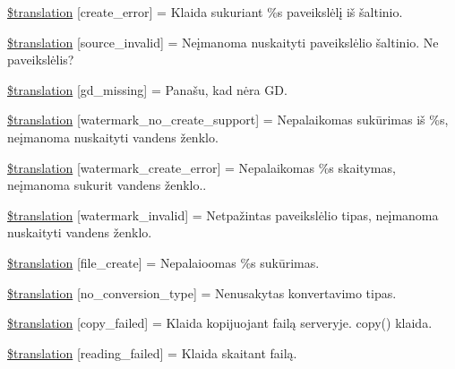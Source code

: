 \begin{DoxyCompactItemize}
\item 
\hyperlink{class_8upload_8lt___l_t_8php_a53013ce9255c4e1849098ddd9fdb2b3f}{\$translation} \mbox{[}\textquotesingle{}create\+\_\+error\textquotesingle{}\mbox{]} = \textquotesingle{}Klaida sukuriant \%s paveikslėlį iš šaltinio.\textquotesingle{}
\item 
\hyperlink{class_8upload_8lt___l_t_8php_a6ab0a660b457eaf2d3434b225449fdd6}{\$translation} \mbox{[}\textquotesingle{}source\+\_\+invalid\textquotesingle{}\mbox{]} = \textquotesingle{}Neįmanoma nuskaityti paveikslėlio šaltinio. Ne paveikslėlis?\textquotesingle{}
\item 
\hyperlink{class_8upload_8lt___l_t_8php_a7f3dfcc0db4bbc0f2e7210c439798e56}{\$translation} \mbox{[}\textquotesingle{}gd\+\_\+missing\textquotesingle{}\mbox{]} = \textquotesingle{}Panašu, kad nėra G\+D.\textquotesingle{}
\item 
\hyperlink{class_8upload_8lt___l_t_8php_a82d5853430ab72dc1f9799ec36144cc6}{\$translation} \mbox{[}\textquotesingle{}watermark\+\_\+no\+\_\+create\+\_\+support\textquotesingle{}\mbox{]} = \textquotesingle{}Nepalaikomas sukūrimas iš \%s, neįmanoma nuskaityti vandens ženklo.\textquotesingle{}
\item 
\hyperlink{class_8upload_8lt___l_t_8php_aabca0b65dadbc6184415c16375f284ca}{\$translation} \mbox{[}\textquotesingle{}watermark\+\_\+create\+\_\+error\textquotesingle{}\mbox{]} = \textquotesingle{}Nepalaikomas \%s skaitymas, neįmanoma sukurit vandens ženklo..\textquotesingle{}
\item 
\hyperlink{class_8upload_8lt___l_t_8php_ac336e7a5701e47ba4a05e9e498a3cc44}{\$translation} \mbox{[}\textquotesingle{}watermark\+\_\+invalid\textquotesingle{}\mbox{]} = \textquotesingle{}Netpažintas paveikslėlio tipas, neįmanoma nuskaityti vandens ženklo.\textquotesingle{}
\item 
\hyperlink{class_8upload_8lt___l_t_8php_a1ecb4673e4fb69e06b3f20b65cecf30a}{\$translation} \mbox{[}\textquotesingle{}file\+\_\+create\textquotesingle{}\mbox{]} = \textquotesingle{}Nepalaioomas \%s sukūrimas.\textquotesingle{}
\item 
\hyperlink{class_8upload_8lt___l_t_8php_a4712d7ec28e9a7f17eb3338af2358363}{\$translation} \mbox{[}\textquotesingle{}no\+\_\+conversion\+\_\+type\textquotesingle{}\mbox{]} = \textquotesingle{}Nenusakytas konvertavimo tipas.\textquotesingle{}
\item 
\hyperlink{class_8upload_8lt___l_t_8php_a783c9358bcf54a054545b50098bc679b}{\$translation} \mbox{[}\textquotesingle{}copy\+\_\+failed\textquotesingle{}\mbox{]} = \textquotesingle{}Klaida kopijuojant failą serveryje. copy() klaida.\textquotesingle{}
\item 
\hyperlink{class_8upload_8lt___l_t_8php_a01bea14c9fd5f353f62db44beabfcd42}{\$translation} \mbox{[}\textquotesingle{}reading\+\_\+failed\textquotesingle{}\mbox{]} = \textquotesingle{}Klaida skaitant failą.\textquotesingle{}
\end{DoxyCompactItemize}


